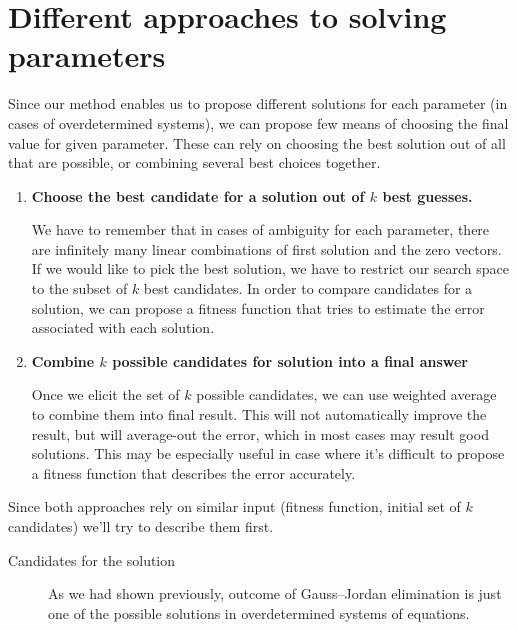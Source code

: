 \section{Different approaches to solving parameters}
Since our method enables us to propose different solutions for each parameter (in cases of overdetermined systems), we can propose few means of choosing the final value for given parameter.
These can rely on choosing the best solution out of all that are possible, or combining several best choices together.
\begin{enumerate}
    \item \textbf{Choose the best candidate for a solution out of $k$ best guesses.}

        We have to remember that in cases of ambiguity for each parameter, there are infinitely many linear combinations of first solution and the zero vectors.
        If we would like to pick the best solution, we have to restrict our search space to the subset of $k$ best candidates.
        In order to compare candidates for a solution, we can propose a fitness function that tries to estimate the error associated with each solution.
    \item \textbf{Combine $k$ possible candidates for solution into a final answer}
        
        Once we elicit the set of $k$ possible candidates, we can use weighted average to combine them into final result.
        This will not automatically improve the result, but will average-out the error, which in most cases may result good solutions.
        This may be especially useful in case where it's difficult to propose a fitness function that describes the error accurately.
\end{enumerate}

Since both approaches rely on similar input (fitness function, initial set of $k$ candidates) we'll try to describe them first.

\begin{description}
    \item[Candidates for the solution]

    As we had shown previously, outcome of Gauss--Jordan elimination is just one of the possible solutions in overdetermined systems of equations.
\end{description}


